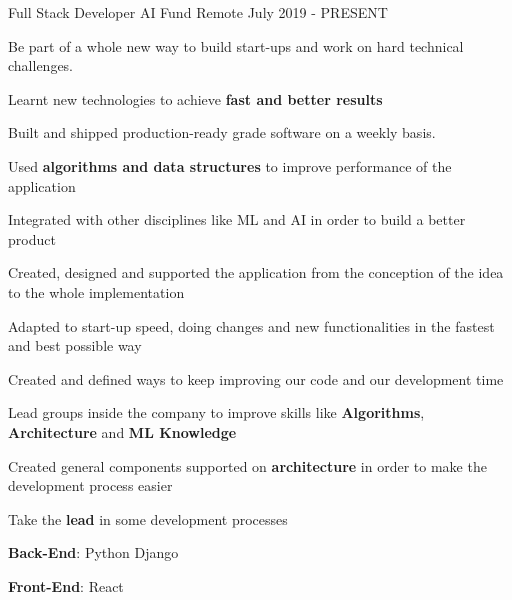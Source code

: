 

\begin{cventries}


  \cventry
    {Full Stack Developer}
    {AI Fund}
    {Remote}
    {July 2019 - PRESENT}
    {
      \begin{cvitems}
        \item {Be part of a whole new way to build start-ups and work on hard technical challenges.}
        \item {Learnt new technologies to achieve \textbf{fast and better results}}
        \item {Built and shipped production-ready grade software on a weekly basis.}
        \item {Used \textbf{algorithms and data structures} to improve performance of the application}
        \item {Integrated with other disciplines like ML and AI in order to build a better product}
        \item {Created, designed and supported the application from the conception of the idea to the whole implementation}
        \item {Adapted to start-up speed, doing changes and new functionalities in the fastest and best possible way}
        \item {Created and defined ways to keep improving our code and our development time}
        \item {Lead groups inside the company to improve skills like \textbf{Algorithms}, \textbf{Architecture} and \textbf{ML Knowledge}}
        \item {Created general components supported on \textbf{architecture} in order to make the development process easier}
        \item {Take the \textbf{lead} in some development processes}
        \item {\textbf{Back-End}: Python {\dotsep}  {\dotsep} Django {\dotsep} }
        \item {\textbf{Front-End}: React {\dotsep} }

\end{cvitems}}
\end{cventries}
